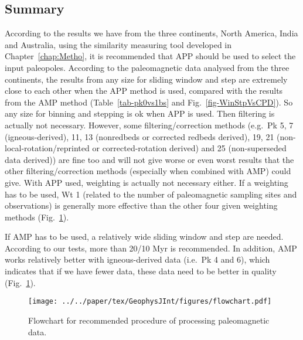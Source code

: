 \subsection{Summary}

According to the results we have from the three continents, North America, India
and Australia, using the similarity measuring tool developed in
Chapter~\ref{chap:Metho}, it is recommended that APP should be used to select
the input paleopoles. According to the paleomagnetic data analysed from the
three continents, the results from any size for sliding window and step are
extremely close to each other when the APP method is used, compared with the
results from the AMP method (Table~\ref{tab-pk0vs1bs} and
Fig.~\ref{fig-WinStpVsCPD}). So any size for binning and stepping is ok when APP
is used. Then filtering is actually not necessary. However, some
filtering/correction methods (e.g.\ Pk 5, 7 (igneous-derived), 11, 13
(nonredbeds or corrected redbeds derived), 19, 21 (non-local-rotation/reprinted
or corrected-rotation derived) and 25 (non-superseded data derived)) are fine
too and will not give worse or even worst results that the other
filtering/correction methods (especially when combined with AMP) could give.
With APP used, weighting is actually not necessary either. If a weighting has to
be used, Wt 1 (related to the number of paleomagnetic sampling sites and
observations) is generally more effective than the other four given weighting
methods (Fig.~\ref{fig-flow}).

If AMP has to be used, a relatively wide sliding window and step are needed.
According to our tests, more than 20/10 Myr is recommended. In addition, AMP
works relatively better with igneous-derived data (i.e.\ Pk 4 and 6), which
indicates that if we have fewer data, these data need to be better in quality
(Fig.~\ref{fig-flow}).

\begin{figure}
  \centering
  \texttt{[image: ../../paper/tex/GeophysJInt/figures/flowchart.pdf]}
  \caption[Flowchart of making a reliable paleomagnetic APWP]{Flowchart for
    recommended procedure of processing paleomagnetic data.}\label{fig-flow}
\end{figure}
